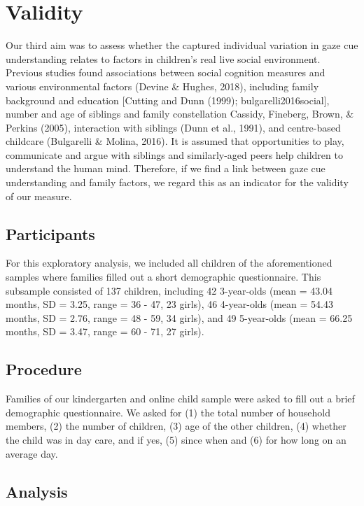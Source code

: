 \documentclass[
  man,floatsintext]{apa6}
\begin{document}
\hypertarget{validity}{%
\section{Validity}\label{validity}}

Our third aim was to assess whether the captured individual variation in gaze cue understanding relates to factors in children's real live social environment. Previous studies found associations between social cognition measures and various environmental factors (Devine \& Hughes, 2018), including family background and education {[}Cutting and Dunn (1999); bulgarelli2016social{]}, number and age of siblings and family constellation Cassidy, Fineberg, Brown, \& Perkins (2005), interaction with siblings (Dunn et al., 1991), and centre-based childcare (Bulgarelli \& Molina, 2016). It is assumed that opportunities to play, communicate and argue with siblings and similarly-aged peers help children to understand the human mind. Therefore, if we find a link between gaze cue understanding and family factors, we regard this as an indicator for the validity of our measure.

\hypertarget{participants-2}{%
\subsection{Participants}\label{participants-2}}

For this exploratory analysis, we included all children of the aforementioned samples where families filled out a short demographic questionnaire. This subsample consisted of
137 children, including
42 3-year-olds
(mean = 43.04 months,
SD = 3.25,
range = 36
- 47,
23 girls),
46 4-year-olds
(mean = 54.43 months,
SD = 2.76,
range = 48
- 59,
34 girls),
and 49 5-year-olds
(mean = 66.25 months,
SD = 3.47,
range = 60
- 71,
27 girls).

\hypertarget{procedure-2}{%
\subsection{Procedure}\label{procedure-2}}

Families of our kindergarten and online child sample were asked to fill out a brief demographic questionnaire. We asked for (1) the total number of household members, (2) the number of children, (3) age of the other children, (4) whether the child was in day care, and if yes, (5) since when and (6) for how long on an average day.

\hypertarget{analysis-2}{%
\subsection{Analysis}\label{analysis-2}}
\end{document}
